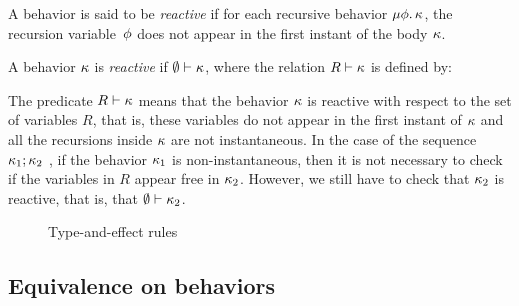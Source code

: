 \documentclass[9pt]{sigplanconf}
\begin{document}
A behavior is said to be \emph{reactive}  if for each recursive behavior $\mu \phi.\, \kappa$, the recursion variable~$\phi$ does not appear in the first instant of the body $\kappa$. 
\begin{definition}
\label{def:reactive_behavior}
A behavior $\kappa$ is \emph{reactive} if $\emptyset \vdash \kappa$, where the relation $R \vdash \kappa$ is defined by:

\end{definition}
The predicate \mbox{$R \vdash \kappa$} means that the behavior $\kappa$ is reactive with respect to the set of variables $R$, that is, these variables do not appear in the first instant of $\kappa$ and all the recursions inside $\kappa$ are not instantaneous. 
In the case of the sequence $\kappa_1 ; \kappa_2$ , if the behavior $\kappa_1$ is non-instantaneous, then it is not necessary to check if the variables in $R$ appear free in $\kappa_2$. However, we still have to check that $\kappa_2$ is reactive, that is, that $\emptyset \vdash \kappa_2$.

%
%
%

\begin{figure*}[t]


\caption{Type-and-effect rules}
\label{fig:rules}
\end{figure*}

\subsection{Equivalence on behaviors}
\label{sec:equiv_behaviors}
\end{document}
